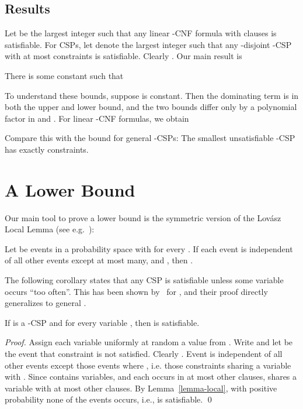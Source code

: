 \documentclass[envcountsect, envcountsame]{llncs}
\begin{document}
\subsection{Results}

Let  be the largest integer  such that any linear -CNF
formula with  clauses is satisfiable.  For CSPs, let
 denote the largest integer  such that any
-disjoint -CSP with at most  constraints is
satisfiable. Clearly . Our main result is

\begin{theorem}
  There is some constant  such that
  
\label{main-result}
\end{theorem}

To understand these bounds, suppose  is constant.
Then the dominating term is  in both the
upper and lower bound, and the two bounds differ only by a polynomial
factor in  and .  For linear -CNF formulas, we obtain



Compare this with the bound for general -CSPs: The smallest
unsatisfiable -CSP has exactly  constraints. 


\section{A Lower Bound}
\label{section-lower}

Our main tool to prove a lower bound is the symmetric version of the
Lov\'asz Local Lemma (see e.g.~\cite{AS00}):

\begin{lemma}
  Let  be events in a probability
  space with  for every . If each event
   is independent of all other events except at most
   many, and , then .
  \label{lemma-local}
\end{lemma}

The following corollary states that any CSP is satisfiable unless some
variable occurs ``too often''. This has been shown by~\cite{KST93} for
, and their proof directly generalizes to general .

\begin{corollary}
  If  is a -CSP and 
  for every variable , then  is satisfiable.
  \label{low-deg}
\end{corollary}

\begin{proof}
  Assign each variable uniformly at random a value from
  .  Write  and let
   be the event that constraint  is not satisfied.
  Clearly .  Event  is
  independent of all other events except those events 
  where , i.e. those
  constraints sharing a variable with . Since 
  contains  variables, and each occurs in at most
   other clauses,  shares a variable with at
  most  other
  clauses. By Lemma~\ref{lemma-local}, with positive probability none
  of the events  occurs, i.e.,  is satisfiable.
  \qed
\end{proof}
\end{document}
